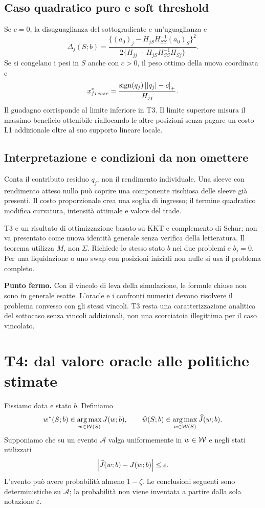 \documentclass[11pt,a4paper]{article}
\theoremstyle{definition}\newtheorem{definition}[theorem]{Definizione}
\theoremstyle{remark}\newtheorem{remark}[theorem]{Osservazione}
\newcommand{\argmax}{\operatorname*{arg\,max}}\newcommand{\argmin}{\operatorname*{arg\,min}}
\newcommand{\important}[1]{\par\smallskip\noindent\colorbox{light}{\parbox{0.963\linewidth}{\textbf{Punto fermo.} #1}}\par\smallskip}
\begin{document}
\subsection{Caso quadratico puro e soft threshold}
Se $c=0$, la disuguaglianza del sottogradiente e un'uguaglianza e
\begin{equation}
 \Delta_j(S;b)=
 \frac{\{(a_0)_j-H_{jS}H_{SS}^{-1}(a_0)_S\}^2}
 {2\{H_{jj}-H_{jS}H_{SS}^{-1}H_{Sj}\}}.\label{eq:schur}
\end{equation}
Se si congelano i pesi in $S$ anche con $c>0$, il peso ottimo della nuova coordinata e
\begin{equation}
 x_{freeze}^*=\frac{\operatorname{sign}(q_j)\left[|q_j|-c\right]_+}{H_{jj}}.
\end{equation}
Il guadagno corrisponde al limite inferiore in T3. Il limite superiore misura il massimo beneficio ottenibile riallocando le altre posizioni senza pagare un costo L1 addizionale oltre al suo supporto lineare locale.

\subsection{Interpretazione e condizioni da non omettere}
Conta il contributo residuo $q_j$, non il rendimento individuale. Una sleeve con rendimento atteso nullo può coprire una componente rischiosa delle sleeve già presenti. Il costo proporzionale crea una soglia di ingresso; il termine quadratico modifica curvatura, intensità ottimale e valore del trade.

T3 e un risultato di ottimizzazione basato su KKT e complemento di Schur; non va presentato come nuova identità generale senza verifica della letteratura. Il teorema utilizza $M$, non $\Sigma$. Richiede lo stesso stato $b$ nei due problemi e $b_j=0$. Per una liquidazione o uno swap con posizioni iniziali non nulle si usa il problema completo.

\important{Con il vincolo di leva della simulazione, le formule chiuse non sono in generale esatte. L'oracle e i confronti numerici devono risolvere il problema convesso con gli stessi vincoli. T3 resta una caratterizzazione analitica del sottocaso senza vincoli addizionali, non una scorciatoia illegittima per il caso vincolato.}

\section{T4: dal valore oracle alle politiche stimate}
\label{sec:T4}
Fissiamo data e stato $b$. Definiamo
\begin{equation}
 w^*(S;b)\in\argmax_{w\in\W(S)}J(w;b),\qquad
 \widehat w(S;b)\in\argmax_{w\in\W(S)}\widehat J(w;b).
\end{equation}
Supponiamo che su un evento $\mathcal A$ valga uniformemente in $w\in\mathcal W$ e negli stati utilizzati
\begin{equation}
 \left|\widehat J(w;b)-J(w;b)\right|\le\varepsilon.\label{eq:uniform}
\end{equation}
L'evento può avere probabilità almeno $1-\zeta$. Le conclusioni seguenti sono deterministiche su $\mathcal A$; la probabilità non viene inventata a partire dalla sola notazione $\varepsilon$.
\end{document}
